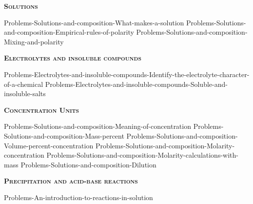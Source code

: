 \documentclass[main.tex]{subfiles}
\newcommand\chapterlabel{Ch-electrolytes}
\begin{document}
\newpage
\setdoublesep{0.35700 em}  %
\setatomsep{1.78500 em}    %
\setbondoffset{0.18265 em} %
\newcommand{\bondwidth}{0.06642 em} %
\setbondstyle{line width = \bondwidth}
\fancyhfoffset[E,O]{0pt}
\setlength{\columnsep}{30pt}
\begin{conclusion}
\end{conclusion}
\begin{multicols*}{2}\setcounter{numA}{1}


{\raggedright\textsc{\textbf{Solutions }}\par}
{Problems-Solutions-and-composition-What-makes-a-solution}
{Problems-Solutions-and-composition-Empirical-rules-of-polarity}
{Problems-Solutions-and-composition-Mixing-and-polarity}


{\raggedright\textsc{\textbf{Electrolytes and insoluble compounds}}\par}
\iftoggle{chem121}{}{
{Problems-Electrolytes-and-insoluble-compounds-Breaking-down-electrolytes-into-ions}%
}
{Problems-Electrolytes-and-insoluble-compounds-Identify-the-electrolyte-character-of-a-chemical}
{Problems-Electrolytes-and-insoluble-compounds-Soluble-and-insoluble-salts}


{\raggedright\textsc{\textbf{Concentration Units }}\par}
{Problems-Solutions-and-composition-Meaning-of-concentration}
{Problems-Solutions-and-composition-Mass-percent}
{Problems-Solutions-and-composition-Volume-percent-concentration}
{Problems-Solutions-and-composition-Molarity-concentration}
{Problems-Solutions-and-composition-Molarity-calculations-with-mass}
{Problems-Solutions-and-composition-Dilution}



{\raggedright\textsc{\textbf{Precipitation and acid-base reactions}}\par}
{Problems-An-introduction-to-reactions-in-solution}
\iftoggle{chem121}{}{
{Problems-Precipitation-reactions-and-acid-base-reactions-Formula-equations-ionic-equations-and-net-ionic-equations}%
}
\iftoggle{chem121}{}{

}
\end{multicols*}
\end{document}
